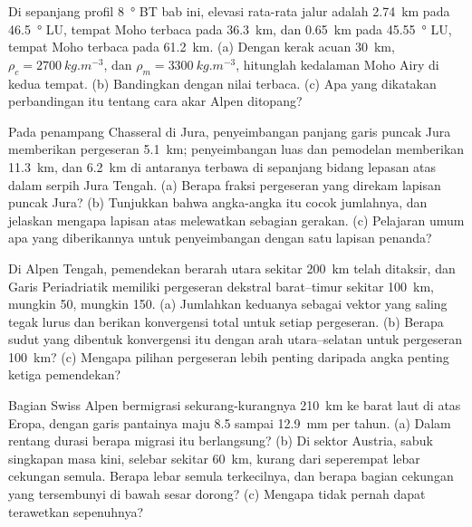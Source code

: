 \begin{exercise}[$\star\star$]\label{exo:b2:alpine-orogen:9}
Di sepanjang profil \qty{8}{\degree} BT bab ini, elevasi rata-rata jalur adalah
\qty{2.74}{km} pada \qty{46.5}{\degree} LU, tempat Moho terbaca pada \qty{36.3}{km}, dan
\qty{0.65}{km} pada \qty{45.55}{\degree} LU, tempat Moho terbaca pada \qty{61.2}{km}. (a) Dengan
kerak acuan \qty{30}{km}, $\rho_c = \qty{2700}{kg.m^{-3}}$, dan $\rho_m =
\qty{3300}{kg.m^{-3}}$, hitunglah kedalaman Moho Airy di kedua tempat. (b) Bandingkan dengan
nilai terbaca. (c) Apa yang dikatakan perbandingan itu tentang cara akar Alpen ditopang?
\end{exercise}

\begin{exercise}[$\star\star\star$]\label{exo:b2:alpine-orogen:10}
Pada penampang Chasseral di Jura, penyeimbangan panjang garis puncak Jura
memberikan pergeseran \qty{5.1}{km}; penyeimbangan luas dan pemodelan memberikan \qty{11.3}{km}, dan
\qty{6.2}{km} di antaranya terbawa di sepanjang bidang lepasan atas dalam serpih Jura Tengah.
(a) Berapa fraksi pergeseran yang direkam lapisan puncak Jura? (b) Tunjukkan bahwa
angka-angka itu cocok jumlahnya, dan jelaskan mengapa lapisan atas melewatkan sebagian gerakan. (c) Pelajaran
umum apa yang diberikannya untuk penyeimbangan dengan satu lapisan penanda?
\end{exercise}

\begin{exercise}[$\star\star\star$]\label{exo:b2:alpine-orogen:11}
Di Alpen Tengah, pemendekan berarah utara sekitar \qty{200}{km} telah
ditaksir, dan Garis Periadriatik memiliki pergeseran dekstral barat--timur sekitar
\qty{100}{km}, mungkin 50, mungkin 150. (a) Jumlahkan keduanya sebagai vektor yang saling tegak lurus dan berikan
konvergensi total untuk setiap pergeseran. (b) Berapa sudut yang dibentuk konvergensi itu dengan
arah utara--selatan untuk pergeseran \qty{100}{km}? (c) Mengapa pilihan pergeseran
lebih penting daripada angka penting ketiga pemendekan?
\end{exercise}

\begin{exercise}[$\star\star\star$]\label{exo:b2:alpine-orogen:12}
Bagian Swiss  Alpen bermigrasi sekurang-kurangnya \qty{210}{km} ke barat laut
di atas Eropa, dengan garis pantainya maju 8.5 sampai \qty{12.9}{mm} per tahun. (a) Dalam rentang
durasi berapa migrasi itu berlangsung? (b) Di sektor Austria, sabuk singkapan masa kini,
selebar sekitar \qty{60}{km}, kurang dari seperempat lebar cekungan semula. Berapa
lebar semula terkecilnya, dan berapa bagian cekungan yang tersembunyi di bawah sesar dorong? (c) Mengapa
 tidak pernah dapat terawetkan sepenuhnya?
\end{exercise}

